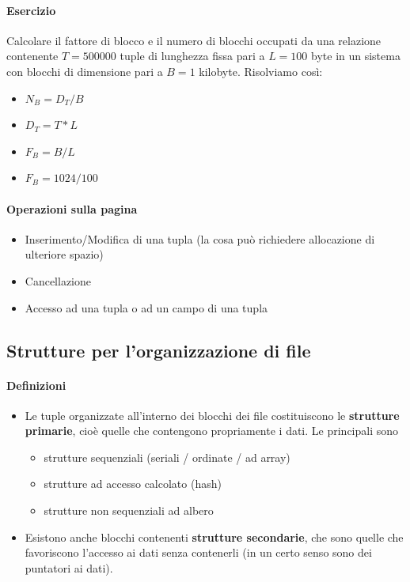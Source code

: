 \paragraph{Esercizio} Calcolare il fattore di blocco e il numero di blocchi occupati da una relazione contenente $T=500000$ tuple di lunghezza fissa pari a $L=100$ byte in  un sistema con blocchi di dimensione pari a $B=1$ kilobyte. Risolviamo così:
\begin{itemize}
	\item $N_B=D_T/B$
	\item $D_T=T*L$
	\item $F_B=B/L$
	\item $F_B=1024/100$
\end{itemize}
\paragraph{Operazioni sulla pagina} 
\begin{itemize}
	\item Inserimento/Modifica di una tupla (la cosa può richiedere allocazione di ulteriore spazio)
	\item Cancellazione
	\item Accesso ad una tupla o ad un campo di una tupla
\end{itemize}
\subsection{Strutture per l'organizzazione di file}
\paragraph{Definizioni}
\begin{itemize}
	\item Le tuple organizzate all'interno dei blocchi dei file costituiscono le \textbf{strutture primarie}, cioè quelle che contengono propriamente i dati. Le principali sono
	\begin{itemize}
		\item strutture sequenziali (seriali / ordinate / ad array)
		\item strutture ad accesso calcolato (hash)
		\item strutture non sequenziali ad albero
	\end{itemize}
	\item Esistono anche blocchi contenenti \textbf{strutture secondarie}, che sono quelle che favoriscono l'accesso ai dati senza contenerli (in un certo senso sono dei puntatori ai dati).
\end{itemize}
